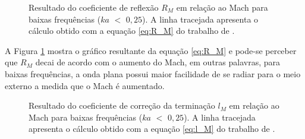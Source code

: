 \begin{figure}[h!]
\centering
  \caption[Coeficiente de reflexão $R_{M}$]{Resultado do coeficiente de reflexão $R_{M}$ em relação ao Mach para baixas frequências ($ka$ $<$ $0,25$). A linha tracejada apresenta o cálculo obtido com a equação \ref{eq:R_M} do trabalho de .}
  \label{fig:comp3}
\end{figure}

A Figura \ref{fig:comp3} mostra o gráfico resultante da equação \ref{eq:R_M} e pode-se perceber que $R_{M}$ decai de acordo com o aumento do Mach, em outras palavras, para baixas frequências, a onda plana possui maior facilidade de se radiar para o meio externo a medida que o Mach é aumentado. 


\begin{figure}[h!]
\centering
  \caption[Coeficiente de correção da terminação $l_{M}$]{Resultado do coeficiente de correção da terminação $l_{M}$ em relação ao Mach para baixas frequências ($ka$ $<$ $0,25$). A linha tracejada apresenta o cálculo obtido com a equação \ref{eq:l_M} do trabalho de .}
  \label{fig:comp4}
\end{figure}

